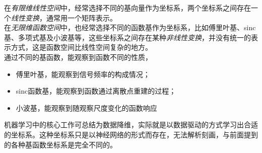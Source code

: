 	在\textit{有限维线性空间}中，经常选择不同的基向量作为坐标系，两个坐标系之间存在一个\textit{线性变换}，通常用一个矩阵表示。\\

	在\textit{无限维函数空间}中，也经常选择不同的函数基作为坐标系，比如傅里叶基、sinc基、多项式基及小波基等，这些坐标系之间存在某种\textit{非线性变换}，并没有统一的表示方式，这是函数空间比线性空间复杂的地方。\\

	通过不同的基函数，能观察到函数不同的性质，
	\begin{itemize}
		\item 傅里叶基，能观察到信号频率的构成情况；
		\item sinc函数基，能观察到函数通过离散点重建的过程；
		\item 小波基，能观察到随观察尺度变化的函数响应
	\end{itemize}

	机器学习中的核心工作可总结为数据降维，实际就是以数据驱动的方式学习出合适的坐标系。这种坐标系只是以神经网络的形式而存在，无法解析刻画，与前面提到的各种基函数坐标系是完全不同的。
	




	





